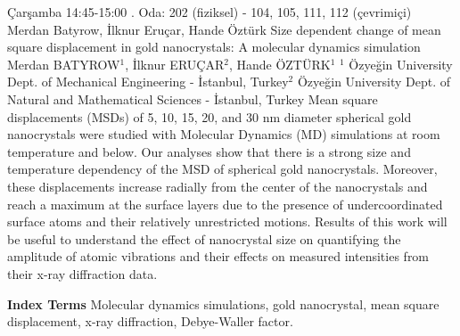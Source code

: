 
    \begin{abstract_basarim}
    {Çarşamba 14:45-15:00}
    {.}
    {Oda: 202 (fiziksel) - 104, 105, 111, 112 (çevrimiçi)}
    {Merdan Batyrow, İlknur Eruçar, Hande Öztürk}
    {Size dependent change of mean square displacement in gold nanocrystals: \newline A molecular dynamics simulation}
    {%
    Merdan BATYROW$^{1}$, İlknur ERUÇAR$^{2}$, Hande ÖZTÜRK$^{1}$}
    {%
    }
    {%
    $^1$ Özyeğin University Dept. of Mechanical Engineering - İstanbul, Turkey\newline{}$^2$ Özyeğin University Dept. of Natural and Mathematical Sciences - İstanbul, Turkey}
    Mean square displacements (MSDs) of 5, 10, 15, 20, and 30 nm diameter spherical gold nanocrystals were studied with Molecular Dynamics (MD) simulations at room temperature and below. Our analyses show that there is a strong size and temperature dependency of the MSD of spherical gold nanocrystals. Moreover, these displacements increase radially from the center of the nanocrystals and reach a maximum at the surface layers due to the presence of undercoordinated surface atoms and their relatively unrestricted motions. Results of this work will be useful to understand the effect of nanocrystal size on quantifying the amplitude of atomic vibrations and their effects on measured intensities from their x-ray diffraction data. 
    
            \textbf{Index Terms} \newline{}Molecular dynamics simulations, gold nanocrystal, mean square displacement, x-ray diffraction, Debye-Waller factor.
    \end{abstract_basarim}
    